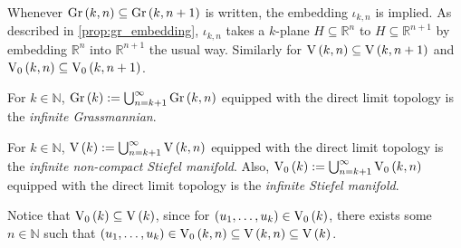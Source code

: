 \begin{remark} Whenever $\Gr{k}{n}\subseteq\Gr{k}{n+1}$ is written, the embedding $\iota_{k,n}$ is implied. As described in \ref{prop:gr_embedding}, $\iota_{k,n}$ takes a $k$-plane $H\subseteq\mathbb{R}^n$ to $H\subseteq\mathbb{R}^{n+1}$ by embedding $\mathbb{R}^n$ into $\mathbb{R}^{n+1}$ the usual way. Similarly for $\St{k}{n}\subseteq\St{k}{n+1}$ and $\StO{k}{n}\subseteq\StO{k}{n+1}$.
\end{remark}

\begin{definition} For $k\in\mathbb{N}$, $\Gr{k}:=\bigcup_{n=k+1}^{\infty}\Gr{k}{n}$ equipped with the direct limit topology is the \emph{infinite Grassmannian}.
\end{definition}

\begin{definition} For $k\in\mathbb{N}$, $\St{k}:=\bigcup_{n=k+1}^{\infty}\St{k}{n}$ equipped with the direct limit topology is the \emph{infinite non-compact Stiefel manifold}. Also, $\StO{k}:=\bigcup_{n=k+1}^{\infty}\StO{k}{n}$ equipped with the direct limit topology is the \emph{infinite Stiefel manifold}.
\end{definition}
\begin{remark}\label{rem:st_inclusion} Notice that $\StO{k}\subseteq\St{k}$, since for $(u_1,\ldots,u_k)\in\StO{k}$, there exists some $n\in\mathbb{N}$ such that $(u_1,\ldots,u_k)\in\StO{k}{n}\subseteq\St{k}{n}\subseteq\St{k}$.
\end{remark}


